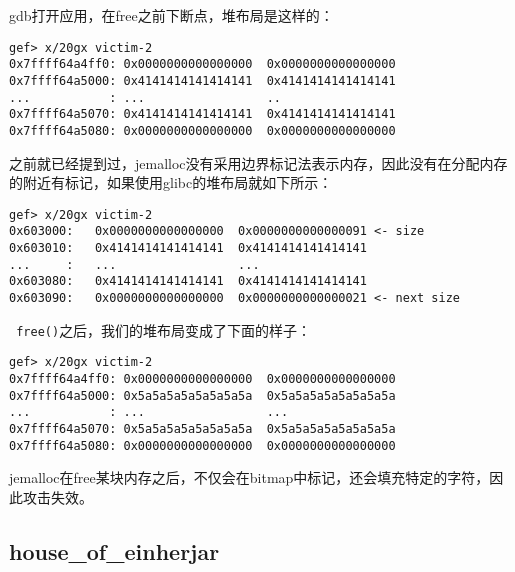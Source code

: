 gdb打开应用，在free之前下断点，堆布局是这样的：
\begin{verbatim}
gef> x/20gx victim-2
0x7ffff64a4ff0: 0x0000000000000000  0x0000000000000000
0x7ffff64a5000: 0x4141414141414141  0x4141414141414141
...           : ...                 ..
0x7ffff64a5070: 0x4141414141414141  0x4141414141414141
0x7ffff64a5080: 0x0000000000000000  0x0000000000000000
\end{verbatim}

之前就已经提到过，jemalloc没有采用边界标记法表示内存，因此没有在分配内存的附近有标记，如果使用glibc的堆布局就如下所示：
\begin{verbatim}
gef> x/20gx victim-2
0x603000:   0x0000000000000000  0x0000000000000091 <- size
0x603010:   0x4141414141414141  0x4141414141414141
...     :   ...                 ...
0x603080:   0x4141414141414141  0x4141414141414141
0x603090:   0x0000000000000000  0x0000000000000021 <- next size
\end{verbatim}

\verb+ free()+之后，我们的堆布局变成了下面的样子：
\begin{verbatim}
gef> x/20gx victim-2
0x7ffff64a4ff0: 0x0000000000000000  0x0000000000000000
0x7ffff64a5000: 0x5a5a5a5a5a5a5a5a  0x5a5a5a5a5a5a5a5a
...           : ...                 ...
0x7ffff64a5070: 0x5a5a5a5a5a5a5a5a  0x5a5a5a5a5a5a5a5a
0x7ffff64a5080: 0x0000000000000000  0x0000000000000000
\end{verbatim}

jemalloc在free某块内存之后，不仅会在bitmap中标记，还会填充特定的字符，因此攻击失效。

\subsection{house\_of\_einherjar}

